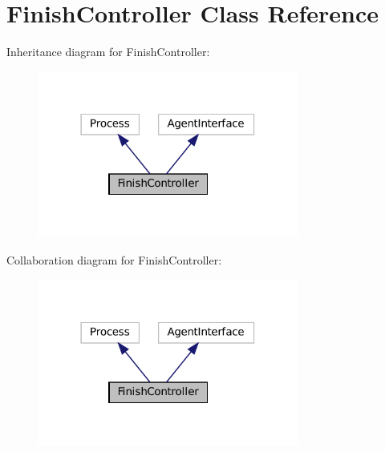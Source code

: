 \hypertarget{classFinishController}{}\section{Finish\+Controller Class Reference}
\label{classFinishController}


Inheritance diagram for Finish\+Controller\+:
\nopagebreak
\begin{figure}[H]
\begin{center}
\leavevmode
\includegraphics[width=242pt]{classFinishController__inherit__graph}
\end{center}
\end{figure}


Collaboration diagram for Finish\+Controller\+:
\nopagebreak
\begin{figure}[H]
\begin{center}
\leavevmode
\includegraphics[width=242pt]{classFinishController__coll__graph}
\end{center}
\end{figure}
